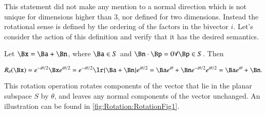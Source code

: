 This statement did not make any mention to a normal direction which is not unique for dimensions higher than 3, nor defined for two dimensions.
Instead the rotational sense is defined by the ordering of the factors in the bivector \( i \).
Let's consider the action of this definition and verify that it has the desired semantics.

Let \( \Bx = \Ba + \Bn \), where \( \Ba \in S \) and \( \Bn \cdot \Bp = 0 \forall \Bp \in S \).  Then

\begin{dmath}\label{eqn:generalRotation:1880}
R_\theta(\Bx)
=
e^{ - i \theta/2 } \Bx e^{ i\theta/2 }
=
e^{ - i \theta/2 } \lr{ \Ba + \Bn } e^{ i\theta/2 }
=
\Ba e^{ i\theta } +
\Bn e^{ - i \theta/2 } e^{ i\theta/2 }
=
\Ba e^{ i\theta } + \Bn.
\end{dmath}

This rotation operation rotates components of the vector that lie in the planar subspace \( S \) by \( \theta \), and leaves any normal components of the vector unchanged.  An illustration can be found in \cref{fig:Rotation:RotationFig1}.

